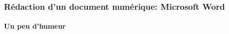 \documentclass[xcolor=table]{beamer}
\begin{document}
\begin{frame}
\frametitle{Rédaction d'un document numérique: Microsoft Word}
\framesubtitle{Un peu d'humeur}


\end{frame}


%
%	
%	
\end{document}
